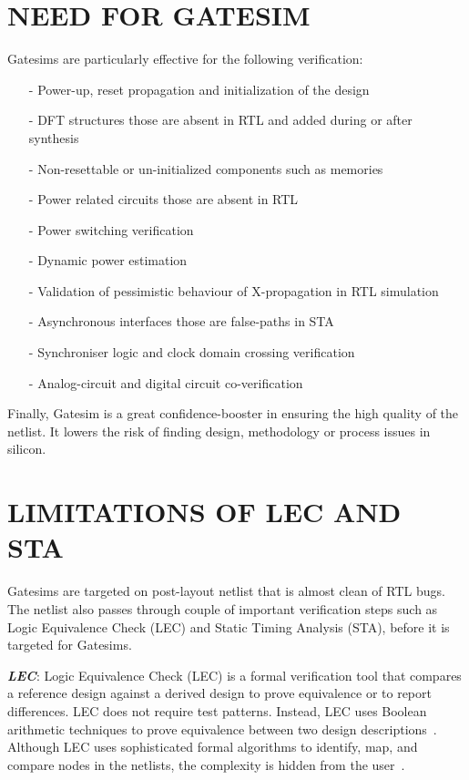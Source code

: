 \section {NEED FOR GATESIM}
Gatesims are particularly effective for the following verification:
\begin{itemize}
	\item[-]Power-up, reset propagation and initialization of the design
	\item[-]DFT structures those are absent in RTL and added during or after synthesis
	\item[-]Non-resettable or un-initialized components such as memories
	\item[-]Power related circuits those are absent in RTL
	\item[-]Power switching verification
	\item[-]Dynamic power estimation
	\item[-]Validation of pessimistic behaviour of X-propagation in RTL simulation
	\item[-]Asynchronous interfaces those are false-paths in STA
	\item[-]Synchroniser logic and clock domain crossing verification
	\item[-]Analog-circuit and digital circuit co-verification
\end{itemize}

Finally, Gatesim is a great confidence-booster in ensuring the high quality of the netlist. It lowers the risk of finding design, methodology or process issues in silicon.




\section{LIMITATIONS OF LEC AND STA}

Gatesims are targeted on post-layout netlist that is almost clean of RTL bugs. The netlist also passes through couple of important verification steps such as Logic Equivalence Check (LEC) and Static Timing Analysis (STA), before it is targeted for Gatesims.

\emph {\bf LEC}: Logic Equivalence Check (LEC) is a formal verification tool that compares a reference design against a derived design to prove equivalence or to report differences.  LEC does not require test patterns. Instead, LEC uses Boolean arithmetic techniques to prove equivalence between two design descriptions~\citep{ieee:boolean}. Although LEC uses sophisticated formal algorithms to identify, map, and compare nodes in the netlists, the complexity is hidden from the user~\citep{lec}.

